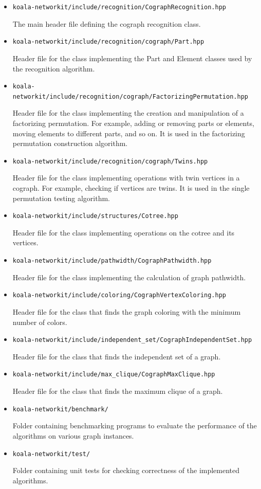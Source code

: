 \begin{itemize}
    \item \texttt{koala-networkit/include/recognition/CographRecognition.hpp}

    The main header file defining the cograph recognition class.

    \item \texttt{koala-networkit/include/recognition/cograph/Part.hpp}
    
    Header file for the class implementing the Part and Element classes used by the recognition algorithm.
    
    \item \texttt{koala-networkit/include/recognition/cograph/FactorizingPermutation.hpp}
    
    Header file for the class implementing the creation and manipulation of a factorizing permutation. For example, adding or removing parts or elements, moving elements to different parts, and so on. It is used in the factorizing permutation construction algorithm.

    \item \texttt{koala-networkit/include/recognition/cograph/Twins.hpp}
    
    Header file for the class implementing operations with twin vertices in a cograph. For example, checking if vertices are twins. It is used in the single permutation testing algorithm.

    \item \texttt{koala-networkit/include/structures/Cotree.hpp}

Header file for the class implementing operations on the cotree and its vertices.
\item \texttt{koala-networkit/include/pathwidth/CographPathwidth.hpp}

Header file for the class implementing the calculation of graph pathwidth.
\item \texttt{koala-networkit/include/coloring/CographVertexColoring.hpp}

Header file for the class that finds the graph coloring with the minimum number of colors.

\item \texttt{koala-networkit/include/independent\_set/CographIndependentSet.hpp}

Header file for the class that finds the independent set of a graph.
\item \texttt{koala-networkit/include/max\_clique/CographMaxClique.hpp}

Header file for the class that finds the maximum clique of a graph.

\item \texttt{koala-networkit/benchmark/}

Folder containing benchmarking programs to evaluate the performance of the algorithms on various graph instances.

\item \texttt{koala-networkit/test/}

Folder containing unit tests for checking correctness of the implemented algorithms.

\end{itemize}
